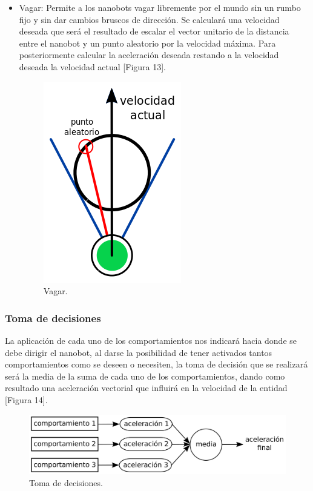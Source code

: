 \begin{itemize}
 \item Vagar: Permite a los nanobots vagar libremente por el mundo sin un rumbo fijo y sin dar cambios bruscos de dirección. Se calculará una velocidad deseada que será el resultado de escalar el vector unitario de la distancia entre el nanobot y  un punto aleatorio  por la velocidad máxima. Para posteriormente calcular la aceleración deseada restando a la velocidad deseada la velocidad actual [Figura 13].  

  \begin{figure}[h]
 \centering
 \includegraphics[scale=0.4]{../images/wander.png}
 \caption{Vagar.}
 \label{fig:../images/wander.png}
 \end{figure}
 
 \end{itemize}


\subsubsection{Toma de decisiones}
\label{sec:toma_decisiones}
La aplicación de cada uno de los comportamientos nos indicará hacia donde se debe dirigir el nanobot, al darse la posibilidad de tener activados tantos comportamientos como se deseen o necesiten, la toma de decisión que se realizará será la media de la suma de cada uno de los comportamientos, dando como resultado una aceleración vectorial que influirá en la velocidad de la entidad [Figura 14].

 \begin{figure}[h]
 \centering
 \includegraphics[scale=0.3]{../images/toma_decisiones.png}
 \caption{Toma de decisiones.}
 \label{fig:../images/toma_decisiones.png}
 \end{figure}


